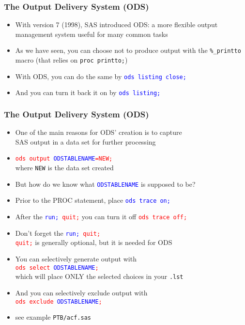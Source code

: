 \documentclass[11pt,pdftex,dvipsnames,usenames,helvetica]{beamer}
\begin{document}
\begin{frame}[fragile]
\frametitle{The Output Delivery System (ODS)}
\begin{itemize}
\item With version 7 (1998), SAS introduced ODS: a more flexible
  output management system useful for many common tasks
\item As we have seen, you can choose not to produce
output with the {\tt \%\_printto} macro (that relies 
on {\tt proc printto;})
\item With ODS, you can do the same by \textcolor{blue}{\tt ods
    listing close;}
\item And you can turn it back it on by \textcolor{blue}{\tt ods
    listing;}
\end{itemize}

\end{frame}

\begin{frame}[fragile]
\frametitle{The Output Delivery System (ODS)}
\begin{itemize}
\item One of the main reasons for ODS' creation is to capture\\ 
SAS output in a data set for further processing
\item \textcolor{red}{\tt ods output \textcolor{blue}{ODSTABLENAME}=NEW;} \\
where {\tt NEW} is the data set created 
\item But how do we know what \textcolor{blue}{\tt ODSTABLENAME} 
is supposed to be?
\item Prior to the PROC statement, place \textcolor{blue}{\tt ods trace on;}
\item After the {\tt \textcolor{blue}{run;} \textcolor{red}{quit;}}
  you can turn it off \textcolor{red}{\tt ods trace off;}
\item Don't forget the {\tt \textcolor{blue}{run;} \textcolor{red}{quit;}}\\
{\tt \textcolor{red}{quit;}} is generally optional, but it is needed for ODS
\item You can selectively generate output with\\
\textcolor{red}{\tt ods select \textcolor{blue}{ODSTABLENAME};}\\
which will place ONLY the selected choices in your {\tt .lst} 
\item And you can selectively exclude output with\\
\textcolor{red}{\tt ods exclude \textcolor{blue}{ODSTABLENAME};}
\item see example {\tt PTB/acf.sas}
\end{itemize}

\end{frame}
\end{document}
